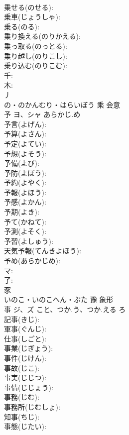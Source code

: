 \documentclass[8pt]{extreport}
\begin{document}
\begin{CJK}{UTF8}{min}
\\	乗せる(のせる): 
\\	乗車(じょうしゃ): 
\\	乗る(のる): 
\\	乗り換える(のりかえる): 
\\	乗っ取る(のっとる): 
\\	乗り越し(のりこし): 
\\	乗り込む(のりこむ): 
\\	千: 
\\	木: 
\\	丿	
\\	の・のかんむり・はらいぼう	乘	会意 
\\	予	ヨ、シャ	あらかじ.め		
\\	予言(よげん): 
\\	予算(よさん): 
\\	予定(よてい): 
\\	予想(よそう): 
\\	予備(よび): 
\\	予防(よぼう): 
\\	予約(よやく): 
\\	予報(よほう): 
\\	予感(よかん): 
\\	予期(よき): 
\\	予て(かねて): 
\\	予測(よそく): 
\\	予習(よしゅう): 
\\	天気予報(てんきよほう): 
\\	予め(あらかじめ): 
\\	マ: 
\\	了: 
\\	豕	
\\	いのこ・いのこへん・ぶた	豫	象形 
\\	事	ジ、ズ	こと、つか.う、つか.える	ろ	
\\	記事(きじ): 
\\	軍事(ぐんじ): 
\\	仕事(しごと): 
\\	事業(じぎょう): 
\\	事件(じけん): 
\\	事故(じこ): 
\\	事実(じじつ): 
\\	事情(じじょう): 
\\	事務(じむ): 
\\	事務所(じむしょ): 
\\	知事(ちじ): 
\\	事態(じたい): 

\end{CJK}
\end{document}
